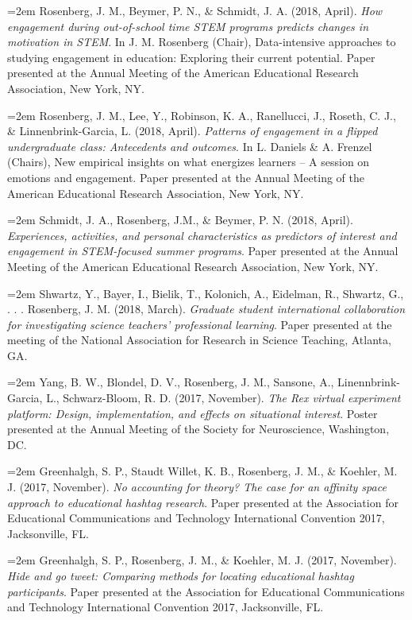 \documentclass[
  14,
]{article}
\begin{document}
\hangindent=2em Rosenberg, J. M., Beymer, P. N., \& Schmidt, J. A.
(2018, April). \emph{How engagement during out-of-school time STEM
programs predicts changes in motivation in STEM}. In J. M. Rosenberg
(Chair), Data-intensive approaches to studying engagement in education:
Exploring their current potential. Paper presented at the Annual Meeting
of the American Educational Research Association, New York, NY.

\hangindent=2em Rosenberg, J. M., Lee, Y., Robinson, K. A., Ranellucci,
J., Roseth, C. J., \& Linnenbrink-Garcia, L. (2018, April).
\emph{Patterns of engagement in a flipped undergraduate class:
Antecedents and outcomes}. In L. Daniels \& A. Frenzel (Chairs), New
empirical insights on what energizes learners -- A session on emotions
and engagement. Paper presented at the Annual Meeting of the American
Educational Research Association, New York, NY.

\hangindent=2em Schmidt, J. A., Rosenberg, J.M., \& Beymer, P. N. (2018,
April). \emph{Experiences, activities, and personal characteristics as
predictors of interest and engagement in STEM-focused summer programs}.
Paper presented at the Annual Meeting of the American Educational
Research Association, New York, NY.

\hangindent=2em Shwartz, Y., Bayer, I., Bielik, T., Kolonich, A.,
Eidelman, R., Shwartz, G., . . . Rosenberg, J. M. (2018, March).
\emph{Graduate student international collaboration for investigating
science teachers' professional learning}. Paper presented at the meeting
of the National Association for Research in Science Teaching, Atlanta,
GA.

\hangindent=2em Yang, B. W., Blondel, D. V., Rosenberg, J. M., Sansone,
A., Linennbrink-Garcia, L., Schwarz-Bloom, R. D. (2017, November).
\emph{The Rex virtual experiment platform: Design, implementation, and
effects on situational interest}. Poster presented at the Annual Meeting
of the Society for Neuroscience, Washington, DC.

\hangindent=2em Greenhalgh, S. P., Staudt Willet, K. B., Rosenberg, J.
M., \& Koehler, M. J. (2017, November). \emph{No accounting for theory?
The case for an affinity space approach to educational hashtag
research}. Paper presented at the Association for Educational
Communications and Technology International Convention 2017,
Jacksonville, FL.

\hangindent=2em Greenhalgh, S. P., Rosenberg, J. M., \& Koehler, M. J.
(2017, November). \emph{Hide and go tweet: Comparing methods for
locating educational hashtag participants}. Paper presented at the
Association for Educational Communications and Technology International
Convention 2017, Jacksonville, FL.
\end{document}
